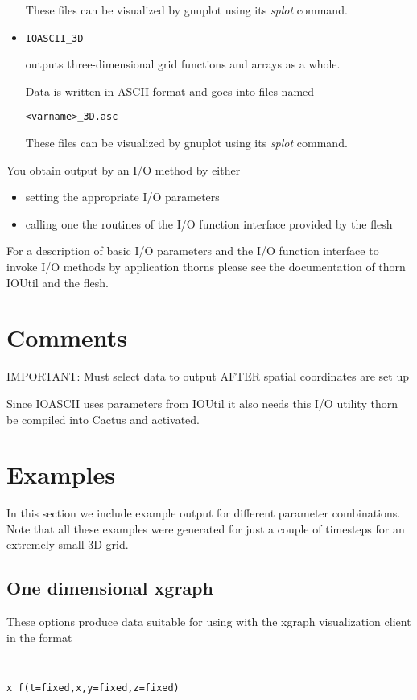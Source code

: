\documentclass{article}
\begin{document}
\begin{itemize}
  These files can be
  visualized by gnuplot using its {\it splot} command.  

  \item {\tt IOASCII\_3D} 

  outputs three-dimensional grid functions and arrays as
  a whole.

  Data is written in ASCII format and goes into files named
  
  {\tt <varname>\_3D.asc}

  These files can be visualized by gnuplot
  using its {\it splot} command.

\end{itemize}
%
You obtain output by an I/O method by either
%
\begin{itemize}
  \item setting the appropriate I/O parameters
  \item calling one the routines of the I/O function interface provided by the flesh
\end{itemize}
%
For a description of basic I/O parameters and the I/O function interface to
invoke I/O methods by application thorns please see the documentation of thorn
IOUtil and the flesh.
%
\section{Comments}

IMPORTANT: Must select data to output AFTER spatial coordinates are set up




%
Since IOASCII uses parameters from IOUtil
it also needs this I/O utility thorn be compiled into Cactus and activated.

\section{Examples}

In this section we include example output for different parameter combinations. 
Note that all these examples were generated for just a couple of timesteps for an extremely small 3D grid.

\subsection{One dimensional xgraph}

These options produce data suitable for using with the xgraph visualization client 
in the format 
{\tt
\begin{verbatim}
x f(t=fixed,x,y=fixed,z=fixed)
\end{verbatim}
}
\end{document}
